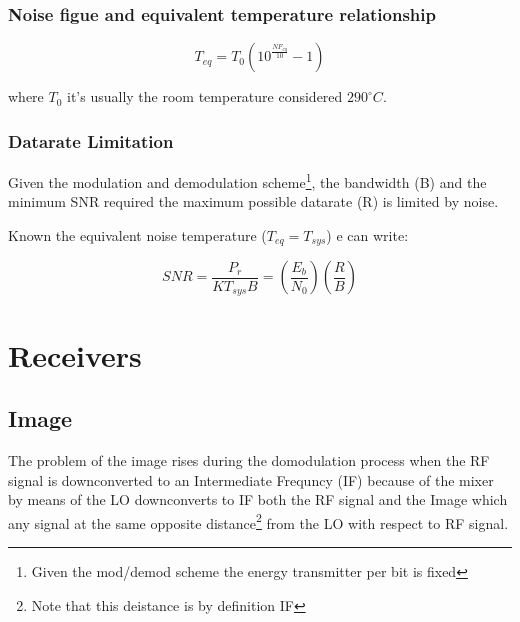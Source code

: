 
\subsection{Noise figue and equivalent temperature relationship} %
\label{sub:noise_figue_and_equivalent_temperature_relationship}


\begin{equation}
	T_{eq}= T_0(10^{\frac{NF_{eq}}{10}}-1)
\end{equation}

where $T_0$ it's usually the room temperature considered $290^{\circ}C$.


\subsection{Datarate Limitation} %
\label{sub:datarate_limitation}


Given the modulation and demodulation scheme\footnote{Given the mod/demod scheme the energy transmitter per bit is fixed}, the bandwidth (B) and the minimum SNR required the maximum possible datarate (R) is limited by noise.

Known the equivalent noise temperature ($T_{eq}=T_{sys}$) e can write:

\begin{equation}	
SNR = \frac{P_r}{KT_{sys}B}=\left(\frac{E_b}{N_0}\right)\left(\frac{R}{B}\right)
\end{equation}









\chapter{Receivers} %
\label{cha:receivers}


\section{Image} %
\label{sec:image}

The problem of the image rises during the domodulation process when the RF signal is downconverted to an Intermediate Frequncy (IF) because of the mixer by means of the LO downconverts to IF both the RF signal and the Image which any signal at the same opposite distance\footnote{Note that this deistance is by definition IF} from the LO with respect to RF signal.

